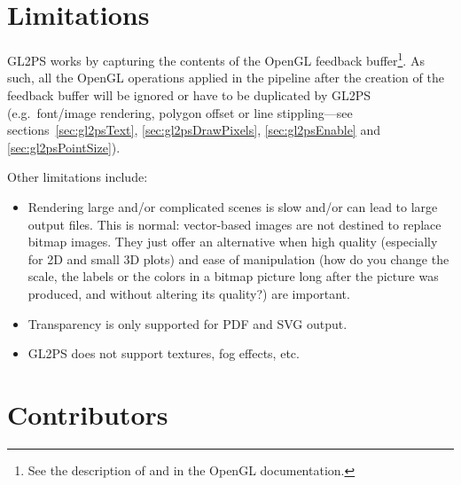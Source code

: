 \section{Limitations}
\label{sec:limitations}

GL2PS works by capturing the contents of the OpenGL feedback
buffer\footnote{See the description of  and
 in the OpenGL documentation.}. As such, all
the OpenGL operations applied in the pipeline after the creation of the
feedback buffer will be ignored or have to be duplicated by GL2PS (e.g.\
font/image rendering, polygon offset or line stippling---see
sections~\ref{sec:gl2psText}, \ref{sec:gl2psDrawPixels},
\ref{sec:gl2psEnable} and \ref{sec:gl2psPointSize}).

Other limitations include:
\begin{itemize}
\item
Rendering large and/or complicated scenes is slow and/or can lead to large
output files. This is normal: vector-based images are not destined to
replace bitmap images. They just offer an alternative when high quality
(especially for 2D and small 3D plots) and ease of manipulation (how do you
change the scale, the labels or the colors in a bitmap picture long after
the picture was produced, and without altering its quality?) are important.
\item
Transparency is only supported for PDF and SVG output.
\item
GL2PS does not support textures, fog effects, etc.
\end{itemize}

%
%
%
%
%
%
%

\section{Contributors}
\label{sec:contrib}

